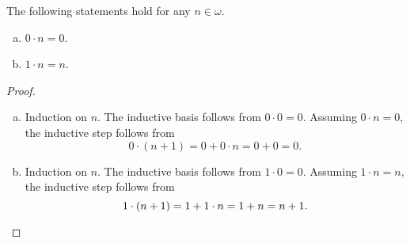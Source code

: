 \documentclass[11pt]{article}
\begin{document}
\begin{proposition}
  The following statements hold for any $n \in \omega$.
  \begin{enumerate}[(a)]
    \item $0 \cdot n = 0$.
    \item $1 \cdot n = n$.
  \end{enumerate}
\end{proposition}
\begin{proof}
  \leavevmode
  \begin{enumerate}[(a)]
    \item Induction on $n$.
    The inductive basis follows from $0 \cdot 0 = 0$.
    Assuming $0 \cdot n = 0$, the inductive step follows from
    \begin{equation*}
      0 \cdot (n + 1) = 0 + 0 \cdot n = 0 + 0 = 0.
    \end{equation*}
    \item Induction on $n$.
    The inductive basis follows from $1 \cdot 0 = 0$.
    Assuming $1 \cdot n = n$, the inductive step follows from
    \begin{equation*}
      1 \cdot (n + 1) = 1 + 1 \cdot n = 1 + n = n + 1.
      \qedhere
    \end{equation*}
  \end{enumerate}
\end{proof}
\end{document}
